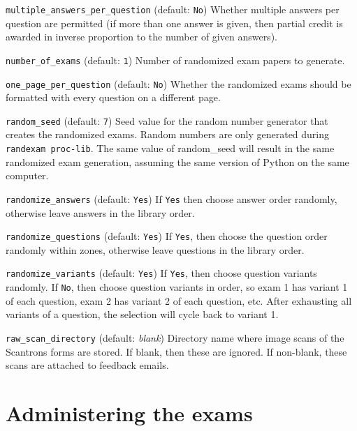 \documentclass{article}
\begin{document}
\hangindent=1cm \texttt{multiple_answers_per_question} (default:
\texttt{No}) Whether multiple answers per question are permitted (if
more than one answer is given, then partial credit is awarded in
inverse proportion to the number of given answers).

\hangindent=1cm \texttt{number_of_exams} (default: \texttt{1}) Number
of randomized exam papers to generate.

\hangindent=1cm \texttt{one_page_per_question} (default: \texttt{No})
Whether the randomized exams should be formatted with every question
on a different page.

\hangindent=1cm \texttt{random_seed} (default: \texttt{7}) Seed value
for the random number generator that creates the randomized
exams. Random numbers are only generated during \texttt{randexam
  proc-lib}. The same value of random_seed will result in the same
randomized exam generation, assuming the same version of Python on the
same computer.

\hangindent=1cm \texttt{randomize_answers} (default: \texttt{Yes}) If
\texttt{Yes} then choose answer order randomly, otherwise leave
answers in the library order.

\hangindent=1cm \texttt{randomize_questions} (default: \texttt{Yes})
If \texttt{Yes}, then choose the question order randomly within zones,
otherwise leave questions in the library order.

\hangindent=1cm \texttt{randomize_variants} (default: \texttt{Yes}) If
\texttt{Yes}, then choose question variants randomly. If \texttt{No},
then choose question variants in order, so exam 1 has variant 1 of
each question, exam 2 has variant 2 of each question, etc. After
exhausting all variants of a question, the selection will cycle back
to variant 1.

\hangindent=1cm \texttt{raw_scan_directory} (default: \emph{blank})
Directory name where image scans of the Scantrons forms are stored. If
blank, then these are ignored. If non-blank, these scans are attached
to feedback emails.

\section{Administering the exams}
\end{document}
